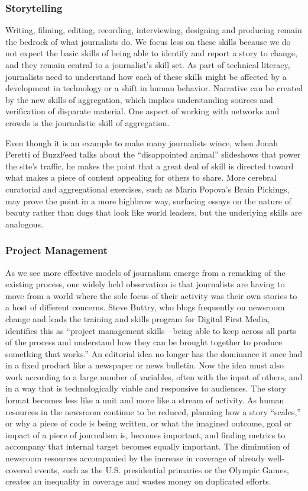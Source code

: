 \subsubsection{Storytelling}
Writing, filming, editing, recording, interviewing, designing and producing
remain the bedrock of what journalists do. We focus less on these skills because
we do not expect the basic skills of being able to identify and report a story to
change, and they remain central to a journalist’s skill set. As part of technical literacy, journalists need to understand how each of these skills might be affected
by a development in technology or a shift in human behavior. Narrative can be
created by the new skills of aggregation, which implies understanding sources
and verification of disparate material. One aspect of working with networks and
crowds is the journalistic skill of aggregation.

Even though it is an example to make many journalists wince, when Jonah Peretti
of BuzzFeed talks about the ``disappointed animal'' slideshows that power the site’s
traffic, he makes the point that a great deal of skill is directed toward what makes a
piece of content appealing for others to share. More cerebral curatorial and aggregational
exercises, such as Maria Popova’s Brain Pickings, may prove the point in a
more highbrow way, surfacing essays on the nature of beauty rather than dogs that
look like world leaders, but the underlying skills are analogous.

\subsubsection{Project Management}

As we see more effective models of journalism emerge from a remaking of the
existing process, one widely held observation is that journalists are having to
move from a world where the sole focus of their activity was their own stories
to a host of different concerns. Steve Buttry, who blogs frequently on newsroom
change and leads the training and skills program for Digital First Media, identifies
this as ``project management skills—being able to keep across all parts of the
process and understand how they can be brought together to produce something
that works.''
An editorial idea no longer has the dominance it once had in a fixed product like
a newspaper or news bulletin. Now the idea must also work according to a large
number of variables, often with the input of others, and in a way that is technologically
viable and responsive to audiences. The story format becomes less like a unit
and more like a stream of activity. As human resources in the newsroom continue to
be reduced, planning how a story ``scales,'' or why a piece of code is being written,
or what the imagined outcome, goal or impact of a piece of journalism is, becomes
important, and finding metrics to accompany that internal target becomes equally
important. The diminution of newsroom resources accompanied by the increase
in coverage of already well-covered events, such as the U.S. presidential primaries
or the Olympic Games, creates an inequality in coverage and wastes money on
duplicated efforts.

